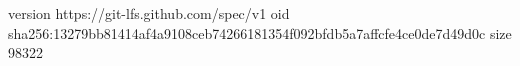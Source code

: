 version https://git-lfs.github.com/spec/v1
oid sha256:13279bb81414af4a9108ceb74266181354f092bfdb5a7affcfe4ce0de7d49d0c
size 98322
